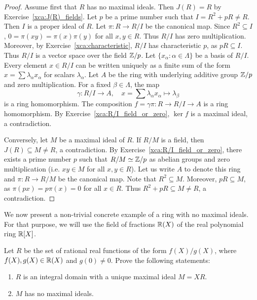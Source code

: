 \begin{proof}
    Assume first that $R$ has no maximal ideals. Then $J(R)=R$ by 
    Exercise~\ref{xca:J(R)_fields}. Let $p$ be a prime number
    such that $I=R^2+pR\ne R$. Then $I$ is a proper ideal of $R$. 
    Let $\pi\colon R\to R/I$ be the canonical map. Since $R^2\subseteq I$, 
    $0=\pi(xy)=\pi(x)\pi(y)$ for all $x,y\in R$. Thus $R/I$ has zero multiplication. 
    Moreover, by Exercise~\ref{xca:characteristic}, 
    $R/I$ has characteristic $p$, as $pR\subseteq I$.  
    Thus $R/I$ is a vector space 
    over the field $\mathbb{Z}/p$.
    Let $\{x_\alpha:\alpha\in\Lambda\}$ be a basis
    of $R/I$. Every element $x\in R/I$ can be written uniquely
    as a finite sum of the form 
    $x=\sum \lambda_{\alpha}x_{\alpha}$ for scalars $\lambda_\alpha$. 
    Let $A$ be the ring with underlying additive group $\mathbb{Z}/p$ and zero multiplication. 
    For a fixed
    $\beta\in\Lambda$, the map 
    \[
    \gamma\colon R/I\to A,\quad 
    x=\sum \lambda_{\alpha}x_{\alpha}\mapsto \lambda_{\beta}
    \]
    is a ring homomorphism. 
    The composition $f=\gamma\pi\colon R\to R/I\to A$ is a ring homomorphism. By Exercise~\ref{xca:R/I_field_or_zero}, $\ker f$ is a maximal ideal, a contradiction. 

    Conversely, let $M$ be a maximal ideal of $R$. If $R/M$ is a field, 
    then $J(R)\subseteq M\ne R$, a contradiction. 
    By Exercise~\ref{xca:R/I_field_or_zero},  there exists a prime
    number $p$ such that $R/M\simeq\mathbb{Z}/p$ as abelian groups and 
    zero multiplication (i.e. $xy\in M$ for all $x,y\in R$). 
    Let us write $A$ to denote this ring and  
    $\pi\colon R\to R/M$ be the canonical map. Note that 
    $R^2\subseteq M$. Moreover, $pR\subseteq M$, as 
    $\pi(px)=p\pi(x)=0$ for all $x\in R$. Thus $R^2+pR\subseteq M\ne R$, a contradiction. 
\end{proof}

We now present a non-trivial concrete example of a ring 
with no maximal ideals. For that purpose, we will use
the field of fractions $\mathbb{R}(X)$ of the real polynomial ring $\mathbb{R}[X]$.  

\begin{exercise}
    \label{xca:example}
    Let $R$ be the set of rational real functions of the form 
    $f(X)/g(X)$, where $f(X),g(X)\in\mathbb{R}(X)$ and $g(0)\ne 0$.  Prove the following statements:
    \begin{enumerate}
        \item $R$ is an integral domain with a unique maximal ideal $M=XR$.
        \item $M$ has no maximal ideals. 
    \end{enumerate}  
\end{exercise}

